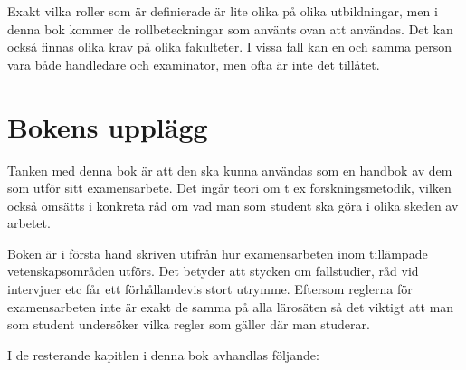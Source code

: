 Exakt vilka roller som är definierade är lite olika på olika
utbildningar, men i denna bok kommer de rollbeteckningar som använts
ovan att användas. Det kan också finnas olika krav på olika fakulteter.
I vissa fall kan en och samma person vara både handledare och
examinator, men ofta är inte det tillåtet.

\section{Bokens upplägg }\label{bokens-uppluxe4gg}

Tanken med denna bok är att den ska kunna användas som en handbok av dem
som utför sitt examensarbete. Det ingår teori om t ex forskningsmetodik,
vilken också omsätts i konkreta råd om vad man som student ska göra i
olika skeden av arbetet.

Boken är i första hand skriven utifrån hur examensarbeten inom
tillämpade vetenskapsområden utförs. Det betyder att stycken om
fallstudier, råd vid intervjuer etc får ett förhållandevis stort
utrymme. Eftersom reglerna för examensarbeten inte är exakt de samma på
alla lärosäten så det viktigt att man som student undersöker vilka
regler som gäller där man studerar.

I de resterande kapitlen i denna bok avhandlas följande:

